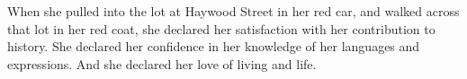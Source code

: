 

When she pulled into the lot at Haywood Street in her red car, and
walked across that lot in her red coat, she declared her satisfaction
with her contribution to history.  She declared her confidence in her
knowledge of her languages and expressions.  And she declared her love
of living and life.

\bye
